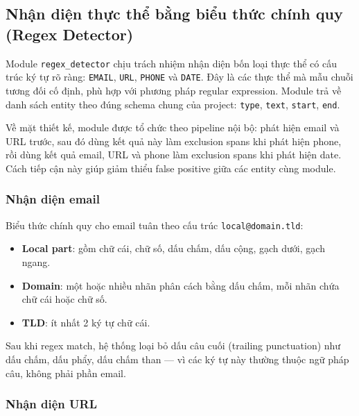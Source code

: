 \subsection{Nhận diện thực thể bằng biểu thức chính quy (Regex Detector)}
\label{sec:regex_detector}

Module \texttt{regex\_detector} chịu trách nhiệm nhận diện bốn loại thực thể có
cấu trúc ký tự rõ ràng: \texttt{EMAIL}, \texttt{URL}, \texttt{PHONE} và
\texttt{DATE}. Đây là các thực thể mà mẫu chuỗi tương đối cố định, phù hợp
với phương pháp regular expression. Module trả về danh sách entity theo đúng
schema chung của project: \texttt{type}, \texttt{text}, \texttt{start},
\texttt{end}.

Về mặt thiết kế, module được tổ chức theo pipeline nội bộ: phát hiện email và
URL trước, sau đó dùng kết quả này làm exclusion spans khi phát hiện phone,
rồi dùng kết quả email, URL và phone làm exclusion spans khi phát hiện date.
Cách tiếp cận này giúp giảm thiểu false positive giữa các entity cùng module.

\subsubsection{Nhận diện email}

Biểu thức chính quy cho email tuân theo cấu trúc \texttt{local@domain.tld}:

\begin{itemize}[nosep]
    \item \textbf{Local part}: gồm chữ cái, chữ số, dấu chấm, dấu cộng, gạch
          dưới, gạch ngang.
    \item \textbf{Domain}: một hoặc nhiều nhãn phân cách bằng dấu chấm, mỗi
          nhãn chứa chữ cái hoặc chữ số.
    \item \textbf{TLD}: ít nhất 2 ký tự chữ cái.
\end{itemize}

Sau khi regex match, hệ thống loại bỏ dấu câu cuối (trailing punctuation) như
dấu chấm, dấu phẩy, dấu chấm than --- vì các ký tự này thường thuộc ngữ pháp
câu, không phải phần email.

\subsubsection{Nhận diện URL}

